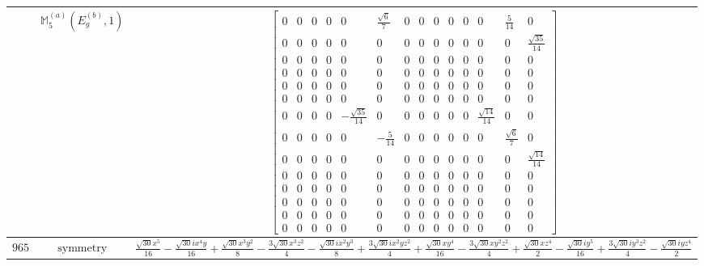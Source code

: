 \documentclass[fleqn,8pt,landscape]{jsarticle}
\begin{document}
\begin{longtable}{ccc}
$  $ & $ \mathbb{M}_{5}^{(a)}(E_{g}^{(b)},1) $ & $ \begin{bmatrix} 0 & 0 & 0 & 0 & 0 & \frac{\sqrt{6}}{7} & 0 & 0 & 0 & 0 & 0 & 0 & \frac{5}{14} & 0 \\ 0 & 0 & 0 & 0 & 0 & 0 & 0 & 0 & 0 & 0 & 0 & 0 & 0 & \frac{\sqrt{35}}{14} \\ 0 & 0 & 0 & 0 & 0 & 0 & 0 & 0 & 0 & 0 & 0 & 0 & 0 & 0 \\ 0 & 0 & 0 & 0 & 0 & 0 & 0 & 0 & 0 & 0 & 0 & 0 & 0 & 0 \\ 0 & 0 & 0 & 0 & 0 & 0 & 0 & 0 & 0 & 0 & 0 & 0 & 0 & 0 \\ 0 & 0 & 0 & 0 & 0 & 0 & 0 & 0 & 0 & 0 & 0 & 0 & 0 & 0 \\ 0 & 0 & 0 & 0 & - \frac{\sqrt{35}}{14} & 0 & 0 & 0 & 0 & 0 & 0 & \frac{\sqrt{14}}{14} & 0 & 0 \\ 0 & 0 & 0 & 0 & 0 & - \frac{5}{14} & 0 & 0 & 0 & 0 & 0 & 0 & \frac{\sqrt{6}}{7} & 0 \\ 0 & 0 & 0 & 0 & 0 & 0 & 0 & 0 & 0 & 0 & 0 & 0 & 0 & \frac{\sqrt{14}}{14} \\ 0 & 0 & 0 & 0 & 0 & 0 & 0 & 0 & 0 & 0 & 0 & 0 & 0 & 0 \\ 0 & 0 & 0 & 0 & 0 & 0 & 0 & 0 & 0 & 0 & 0 & 0 & 0 & 0 \\ 0 & 0 & 0 & 0 & 0 & 0 & 0 & 0 & 0 & 0 & 0 & 0 & 0 & 0 \\ 0 & 0 & 0 & 0 & 0 & 0 & 0 & 0 & 0 & 0 & 0 & 0 & 0 & 0 \\ 0 & 0 & 0 & 0 & 0 & 0 & 0 & 0 & 0 & 0 & 0 & 0 & 0 & 0 \end{bmatrix} $ \\ \hline
$ 965 $ & $ \text{symmetry} $ & $ \frac{\sqrt{30} x^{5}}{16} - \frac{\sqrt{30} i x^{4} y}{16} + \frac{\sqrt{30} x^{3} y^{2}}{8} - \frac{3 \sqrt{30} x^{3} z^{2}}{4} - \frac{\sqrt{30} i x^{2} y^{3}}{8} + \frac{3 \sqrt{30} i x^{2} y z^{2}}{4} + \frac{\sqrt{30} x y^{4}}{16} - \frac{3 \sqrt{30} x y^{2} z^{2}}{4} + \frac{\sqrt{30} x z^{4}}{2} - \frac{\sqrt{30} i y^{5}}{16} + \frac{3 \sqrt{30} i y^{3} z^{2}}{4} - \frac{\sqrt{30} i y z^{4}}{2} $ \\

\end{longtable}
\end{document}
